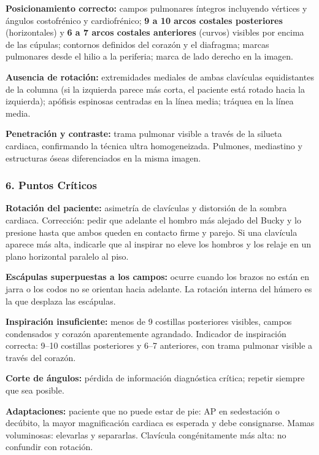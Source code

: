 	\textbf{Posicionamiento correcto:} campos pulmonares íntegros incluyendo vértices y ángulos costofrénico y cardiofrénico; \textbf{9 a 10 arcos costales posteriores} (horizontales) y \textbf{6 a 7 arcos costales anteriores} (curvos) visibles por encima de las cúpulas; contornos definidos del corazón y el diafragma; marcas pulmonares desde el hilio a la periferia; marca de lado derecho en la imagen.
	
	\textbf{Ausencia de rotación:} extremidades mediales de ambas clavículas equidistantes de la columna (si la izquierda parece más corta, el paciente está rotado hacia la izquierda); apófisis espinosas centradas en la línea media; tráquea en la línea media.
	
	\textbf{Penetración y contraste:} trama pulmonar visible a través de la silueta cardiaca, confirmando la técnica ultra homogeneizada. Pulmones, mediastino y estructuras óseas diferenciados en la misma imagen.
	
	\subsubsection*{6. Puntos Críticos}
	
	\textbf{Rotación del paciente:} asimetría de clavículas y distorsión de la sombra cardiaca. Corrección: pedir que adelante el hombro más alejado del Bucky y lo presione hasta que ambos queden en contacto firme y parejo. Si una clavícula aparece más alta, indicarle que al inspirar no eleve los hombros y los relaje en un plano horizontal paralelo al piso.
	
	\textbf{Escápulas superpuestas a los campos:} ocurre cuando los brazos no están en jarra o los codos no se orientan hacia adelante. La rotación interna del húmero es la que desplaza las escápulas.
	
	\textbf{Inspiración insuficiente:} menos de 9 costillas posteriores visibles, campos condensados y corazón aparentemente agrandado. Indicador de inspiración correcta: 9--10 costillas posteriores y 6--7 anteriores, con trama pulmonar visible a través del corazón.
	
	\textbf{Corte de ángulos:} pérdida de información diagnóstica crítica; repetir siempre que sea posible.
	
	\textbf{Adaptaciones:} paciente que no puede estar de pie: AP en sedestación o decúbito, la mayor magnificación cardiaca es esperada y debe consignarse. Mamas voluminosas: elevarlas y separarlas. Clavícula congénitamente más alta: no confundir con rotación.
	

